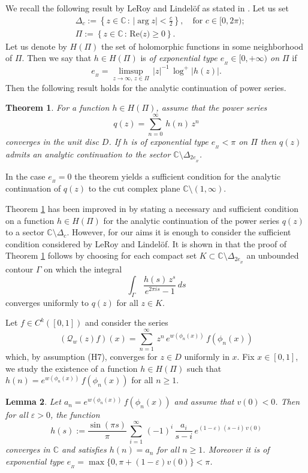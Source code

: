 \documentclass[11pt]{amsart}
\newtheorem{theorem}{Theorem}[section]
\newtheorem{lemma}[theorem]{Lemma}
\theoremstyle{definition}
\theoremstyle{remark}
\theoremstyle{definition}
\numberwithin{equation}{section}
\newcommand{\set}[1]{\left\{#1\right\}}
\newcommand{\C}{\mathbb C}
\newcommand{\eps}{\varepsilon}
\newcommand{\QQ}{\mathcal{Q}}
\newcommand{\real}[1]{\text{Re($#1$)}}
\begin{document}
We recall the following result by LeRoy and Lindel\"of as stated in \cite{ara}. Let us set
\[
\begin{aligned}
& \Delta_c := \set{ z\in \C\, :\, |\arg z| < \frac c2}, \quad \text{for $c\in [0,2\pi)$;} \\[0.2cm]
& \Pi := \set{ z\in \C\, :\, \real{z} \ge 0}.
\end{aligned}
\]
Let us denote by $H(\Pi)$ the set of holomorphic functions in some neighborhood of $\Pi$. Then we say that $h\in H(\Pi)$ is \emph{of exponential type $e_{_\Pi} \in [0,+\infty)$ on $\Pi$} if
\[
e_{_\Pi} = \limsup_{z\to \infty,\, z\in \Pi}\, |z|^{-1}\, \log^+ |h(z)|.
\]
Then the following result holds for the analytic continuation of power series.

\begin{theorem} \label{teo:fund-ps}
For a function $h\in H(\Pi)$, assume that the power series 
\[
q(z) = \sum_{n=0}^\infty\, h(n)\, z^n
\]
converges in the unit disc $D$. If $h$ is of exponential type $e_{_\Pi} < \pi$ on $\Pi$ then $q(z)$ admits an analytic continuation to the sector $\C \setminus \Delta_{2e_{_\Pi}}$.
\end{theorem}

In the case $e_{_\Pi} =0$ the theorem yields a sufficient condition for the analytic continuation of $q(z)$ to the cut complex plane $\C \setminus (1,\infty)$.

Theorem \ref{teo:fund-ps} has been improved in \cite{ara} by stating a necessary and sufficient condition on a function $h\in H(\Pi)$ for the analytic continuation of the power series $q(z)$ to a sector $\C \setminus \Delta_{c}$. However, for our aims it is enough to consider the sufficient condition considered by LeRoy and Lindel\"of. It is shown in \cite{ara} that the proof of Theorem \ref{teo:fund-ps} follows by choosing for each compact set $K\subset \C \setminus \Delta_{2e_{_\Pi}}$ an unbounded contour $\Gamma$ on which the integral
\[
\int_\Gamma\, \frac{h(s)\, z^s}{e^{2\pi i s}-1}\, ds
\]
converges uniformly to $q(z)$ for all $z\in K$.

Let $f\in C^k([0,1])$ and consider the series 
\[
(\QQ_w(z)f) (x) = \sum_{n=1}^\infty\, z^n\, e^{w(\phi_n(x))}\, f(\phi_n(x))
\]
which, by assumption (H7), converges for $z\in D$ uniformly in $x$. Fix $x\in [0,1]$, we study the existence of a function $h\in H(\Pi)$ such that $h(n) = e^{w(\phi_n(x))}\, f(\phi_n(x))$ for all $n\ge 1$.

\begin{lemma} \label{lem:extensions}
Let $a_n = e^{w(\phi_n(x))}\, f(\phi_n(x))$ and assume that $v(0)<0$. Then for all $\eps>0$, the function
\[
h(s) := \frac{\sin (\pi s)}{\pi}\, \sum_{i=1}^\infty\, (-1)^i\, \frac{a_i}{s-i}\, e^{(1-\eps)\, (s-i)\, v(0)}
\]
converges in $\C$ and satisfies $h(n)=a_n$ for all $n\ge 1$. Moreover it is of exponential type $e_{_\Pi} = \max\{0, \pi+(1-\eps) v(0)\} < \pi$.
\end{lemma}
\end{document}
